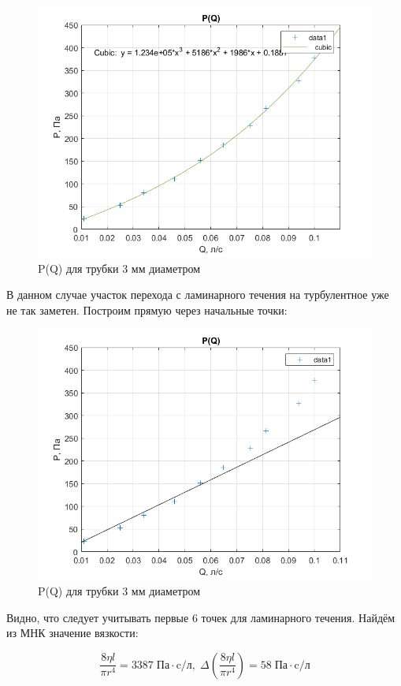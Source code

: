 \documentclass[a4paper, 12pt]{article} %
\begin{document}
\begin{figure}[!h]
    \centering
    \includegraphics[width = 12 cm]{3mm}
    \caption{P(Q) для трубки 3 мм диаметром}
    \label{fig:vac}
\end{figure}

В данном случае участок перехода с ламинарного течения на турбулентное уже не так заметен. Построим прямую через начальные точки: 

\begin{figure}[!h]
    \centering
    \includegraphics[width = 12 cm]{3mm2}
    \caption{P(Q) для трубки 3 мм диаметром}
    \label{fig:vac}
\end{figure}

Видно, что следует учитывать первые 6 точек для ламинарного течения. Найдём из МНК значение вязкости:

\begin{equation}
    \frac{8\eta l}{\pi r^4} = 3387 \; \text{Па} \cdot \text{c/л}, \; \Delta \left( \frac{8\eta l}{\pi r^4} \right) = 58 \; \text{Па} \cdot \text{c/л}
\end{equation}
\end{document}

